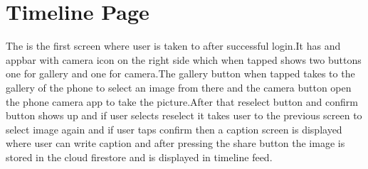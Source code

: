 \section{Timeline Page}
The is the first screen where user is taken to after successful login.It has and appbar with camera icon on the right side which when tapped shows two buttons one for gallery and one for camera.The gallery button when tapped takes to the gallery of the phone to select an image from there and the camera button open the phone camera app to take the picture.After that reselect button and confirm button shows up and if user selects reselect it takes user to the previous screen to select image again and if user taps confirm then a caption screen is displayed where user can write caption and after pressing the share button the image is stored in the cloud firestore and is displayed in timeline feed.
